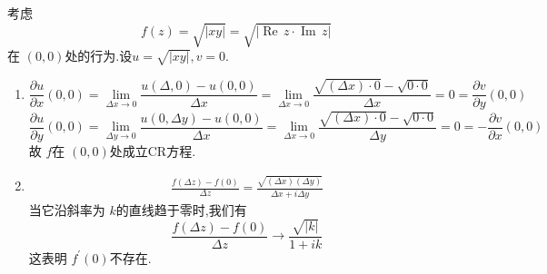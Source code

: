 \documentclass[../../复变函数.tex]{subfiles}
\begin{document}
\begin{example}
考虑 \[
f\left( z \right)= \sqrt{\left| xy \right| }=  \sqrt{\left| \operatorname{Re}\,z\cdot \operatorname{Im}\,z \right| } 
\]在 \(  \left( 0,0 \right)   \)处的行为.设\(  u= \sqrt{\left| xy \right| },v= 0  \).   \begin{enumerate}
    \item \[
\frac{\partial u}{\partial x}\left( 0,0 \right)= \lim_{ \Delta x\to 0} \frac{u\left(  \Delta ,0 \right)-u\left( 0,0 \right)   }{ \Delta x }  = \lim_{ \Delta x\to 0} \frac{\sqrt{\left(  \Delta x \right)\cdot 0 }-\sqrt{0\cdot 0} }{ \Delta x } = 0 =  \frac{\partial v}{\partial y}\left( 0,0 \right) 
\] \[
\frac{\partial u}{\partial y}\left( 0,0 \right) =  \lim_{ \Delta y\to 0} \frac{u\left( 0, \Delta y \right)-u\left( 0,0 \right)   }{  \Delta x}  = \lim_{ \Delta x\to 0} \frac{\sqrt{\left(  \Delta x \right)\cdot 0 }-\sqrt{0\cdot 0} }{ \Delta y } =  0= -\frac{\partial v}{\partial x}\left( 0,0 \right)  
\]故 \(  f  \)在 \(  \left( 0,0 \right)   \)处成立CR方程.  
 \item \[
 \begin{aligned}
 \frac{f\left(  \Delta z \right)-f\left( 0 \right)   }{ \Delta z }  =  \frac{\sqrt{\left(  \Delta x \right)\left(  \Delta y \right)  } }{ \Delta x+ i \Delta y }  
 \end{aligned}
 \]当它沿斜率为 \(  k  \)的直线趋于零时,我们有 \[
 \frac{f\left(  \Delta z \right)-f\left( 0 \right)   }{ \Delta z } \to  \frac{\sqrt{\left| k \right| } }{1+ ik }  
 \]这表明 \(  f^{\prime} \left( 0 \right)   \)不存在.  
\end{enumerate}

    
\end{example}

\hspace*{\fill} 
\end{document}
